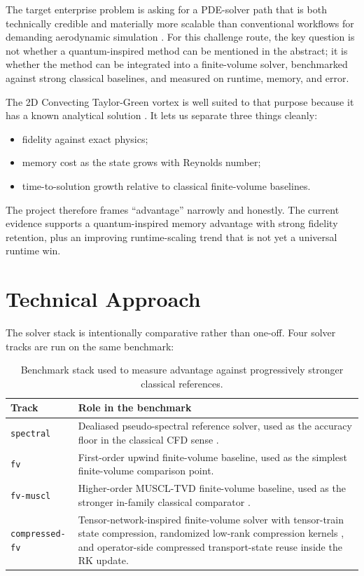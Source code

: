 \documentclass[11pt,a4paper]{article}
\begin{document}
The target enterprise problem is asking for a PDE-solver path that is both technically credible and materially more scalable than conventional workflows for demanding aerodynamic simulation \cite{ChallengeBrief2025}. For this challenge route, the key question is not whether a quantum-inspired method can be mentioned in the abstract; it is whether the method can be integrated into a finite-volume solver, benchmarked against strong classical baselines, and measured on runtime, memory, and error.

The 2D Convecting Taylor-Green vortex is well suited to that purpose because it has a known analytical solution \cite{TaylorGreen1937}. It lets us separate three things cleanly:

\begin{itemize}
\item fidelity against exact physics;
\item memory cost as the state grows with Reynolds number;
\item time-to-solution growth relative to classical finite-volume baselines.
\end{itemize}

The project therefore frames ``advantage'' narrowly and honestly. The current evidence supports a quantum-inspired memory advantage with strong fidelity retention, plus an improving runtime-scaling trend that is not yet a universal runtime win.

\section{Technical Approach}

The solver stack is intentionally comparative rather than one-off. Four solver tracks are run on the same benchmark:

\begin{table}[H]
\centering
\small
\begin{tabularx}{\textwidth}{@{}p{}Y@{}}
\toprule
Track & Role in the benchmark \\
\midrule
\texttt{spectral} & Dealiased pseudo-spectral reference solver, used as the accuracy floor in the classical CFD sense \cite{Orszag1971}. \\
\texttt{fv} & First-order upwind finite-volume baseline, used as the simplest finite-volume comparison point. \\
\texttt{fv-muscl} & Higher-order MUSCL-TVD finite-volume baseline, used as the stronger in-family classical comparator \cite{vanLeer1979,GottliebShu1998}. \\
\texttt{compressed-fv} & Tensor-network-inspired finite-volume solver with tensor-train state compression, randomized low-rank compression kernels \cite{Oseledets2011,HalkoMartinssonTropp2011}, and operator-side compressed transport-state reuse inside the RK update. \\
\bottomrule
\end{tabularx}
\caption{Benchmark stack used to measure advantage against progressively stronger classical references.}
\end{table}
\end{document}
